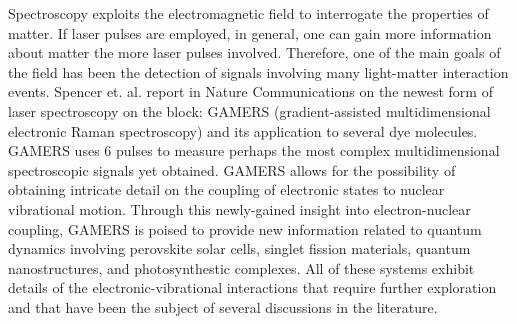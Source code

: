 Spectroscopy exploits the electromagnetic field to interrogate the properties of matter.  If laser pulses are employed, in general, one can gain more information about matter the more laser pulses involved. Therefore, one of the main goals of the field has been the detection of signals involving many light-matter interaction events.  Spencer et. al. report in Nature Communications \cite{GAMERS} on the newest form of laser spectroscopy on the block: GAMERS (gradient-assisted multidimensional electronic Raman spectroscopy) and its application to several dye molecules.  GAMERS uses 6 pulses to measure perhaps the most complex multidimensional spectroscopic signals yet obtained. GAMERS allows for the possibility of obtaining  intricate detail on the coupling of electronic states to nuclear vibrational motion.  Through this newly-gained insight into electron-nuclear coupling, GAMERS is poised to provide new information related to quantum dynamics involving  perovskite solar cells\cite{Perovskite}, singlet fission materials\cite{singletFissionVibration}, quantum nanostructures\cite{NanostructureVibrations}, and photosynthestic complexes\cite{FMO1}. All of these systems exhibit details of the electronic-vibrational interactions that require further exploration and that have been the subject of several discussions in the literature.
